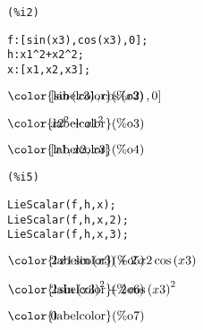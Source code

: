 \noindent
\begin{minipage}[t]{8ex}
\color{red}\bf
\begin{verbatim}
(%i2) 
\end{verbatim}
\end{minipage}
\begin{minipage}[t]{\textwidth}
\color{blue}
\begin{verbatim}
f:[sin(x3),cos(x3),0];
h:x1^2+x2^2;
x:[x1,x2,x3];
\end{verbatim}
\end{minipage}
\begin{math}\displaystyle
\parbox{8ex}{\color{labelcolor}(\%o2) }
[\mathrm{sin}\left( x3\right) ,\mathrm{cos}\left( x3\right) ,0]
\end{math}

\begin{math}\displaystyle
\parbox{8ex}{\color{labelcolor}(\%o3) }
{x2}^{2}+{x1}^{2}
\end{math}

\begin{math}\displaystyle
\parbox{8ex}{\color{labelcolor}(\%o4) }
[x1,x2,x3]
\end{math}


\noindent
\begin{minipage}[t]{8ex}
\color{red}\bf
\begin{verbatim}
(%i5) 
\end{verbatim}
\end{minipage}
\begin{minipage}[t]{\textwidth}
\color{blue}
\begin{verbatim}
LieScalar(f,h,x);
LieScalar(f,h,x,2);
LieScalar(f,h,x,3);
\end{verbatim}
\end{minipage}
\begin{math}\displaystyle
\parbox{8ex}{\color{labelcolor}(\%o5) }
2\,x1\,\mathrm{sin}\left( x3\right) +2\,x2\,\mathrm{cos}\left( x3\right) 
\end{math}

\begin{math}\displaystyle
\parbox{8ex}{\color{labelcolor}(\%o6) }
2\,{\mathrm{sin}\left( x3\right) }^{2}+2\,{\mathrm{cos}\left( x3\right) }^{2}
\end{math}

\begin{math}\displaystyle
\parbox{8ex}{\color{labelcolor}(\%o7) }
0
\end{math}

